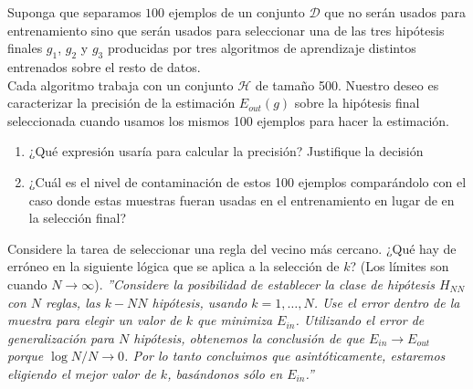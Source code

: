 \documentclass[12pt]{article}
\theoremstyle{definition}
\begin{document}
\begin{pregunta}
Suponga que separamos $100$ ejemplos de un conjunto $\mathcal{D}$ que no serán usados para entrenamiento sino que serán usados para seleccionar una de las tres hipótesis finales $g_1$, $g_2$ y $g_3$ producidas por tres algoritmos de aprendizaje distintos entrenados sobre el resto de datos.\\
Cada algoritmo trabaja con un conjunto $\mathcal{H}$ de tamaño 500. Nuestro deseo es caracterizar la precisión de la estimación $E_{out}(g)$ sobre la hipótesis final seleccionada cuando usamos los mismos 100 ejemplos para hacer la estimación.
\begin{enumerate}[a]
\item ¿Qué expresión usaría para calcular la precisión? Justifique la decisión
\item ¿Cuál es el nivel de contaminación de estos 100 ejemplos comparándolo con el caso donde estas muestras fueran usadas en el entrenamiento en lugar de en la selección final?
\end{enumerate}


\end{pregunta}

\begin{pregunta}
Considere la tarea de seleccionar una regla del vecino más cercano. ¿Qué hay de erróneo en la siguiente lógica que se aplica a la selección de $k$? (Los límites son cuando $N \rightarrow \infty$).
\textit{''Considere la posibilidad de establecer la clase de hipótesis $H_{NN}$ con $N$ reglas, las $k-NN$ hipótesis, usando $k =1,\dots,N$. Use el error dentro de la muestra para elegir un valor de $k$ que minimiza $E_{in}$. Utilizando el error de generalización para $N$ hipótesis, obtenemos la conclusión
de que $E_{in} \rightarrow E_{out}$ porque $\log N/N \rightarrow 0$. Por lo tanto concluimos que asintóticamente,
estaremos eligiendo el mejor valor de $k$, basándonos sólo en $E_{in}$.''}\\


\end{pregunta}
\end{document}
